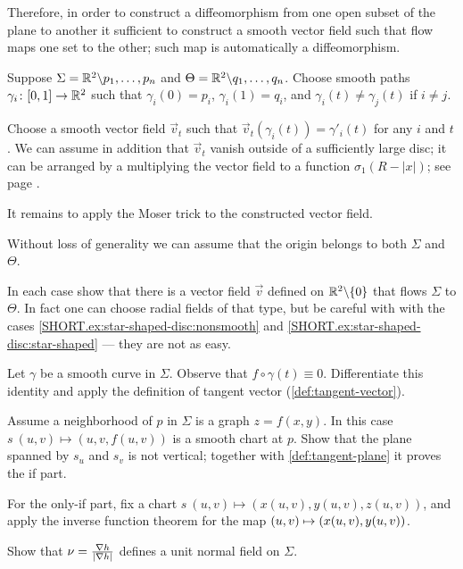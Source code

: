 Therefore, in order to construct a diffeomorphism from one open subset of the plane to another it sufficient to construct a smooth vector field such that flow maps one set to the other;
such map is automatically a diffeomorphism.


Suppose $\Sigma=\mathbb{R}^2\backslash{p_1,\dots,p_n}$ and $\Theta=\mathbb{R}^2\backslash{q_1,\dots,q_n}$.
Choose smooth paths $\gamma_i\colon[0,1]\to \mathbb{R}^2$ such that $\gamma_i(0)=p_i$,
$\gamma_i(1)=q_i$, and $\gamma_i(t)\ne \gamma_j(t)$ if $i\ne j$.

Choose a smooth vector field $\vec v_t$ such that $\vec v_t(\gamma_i(t))=\gamma'_i(t)$ for any $i$ and $t$.
We can assume in addition that $\vec v_t$ vanish outside of a sufficiently large disc; it can be arranged by a multiplying the vector field to a function 
$\sigma_1(R-|x|)$; see page \pageref{page:sigma-function}.

It remains to apply the Moser trick to the constructed vector field. 

Without loss of generality we can assume that the origin belongs to both $\Sigma$ and $\Theta$.

In each case show that there is a vector field $\vec v$ defined on $\mathbb{R}^2\backslash\{0\}$ that flows $\Sigma$ to $\Theta$.
In fact one can choose radial fields of that type,
but be careful with with the cases \ref{SHORT.ex:star-shaped-disc:nonsmooth} and \ref{SHORT.ex:star-shaped-disc:star-shaped} --- they are not as easy.

Let $\gamma$ be a smooth curve in $\Sigma$.
Observe that $f\circ\gamma(t)\equiv 0$.
Differentiate this identity and apply the definition of tangent vector (\ref{def:tangent-vector}).

Assume a neighborhood of $p$ in $\Sigma$ is a graph $z=f(x,y)$.
In this case $s\:(u,v)\mapsto (u,v,f(u,v))$ is a smooth chart at $p$.
Show that the plane spanned by $s_u$ and $s_v$ is not vertical;
together with \ref{def:tangent-plane} it proves the if part.

For the only-if part, fix a chart 
$s\:(u,v)\mapsto(x(u,v),y(u,v),z(u,v))$,
and apply the inverse function theorem for the map $(u,v)\z\mapsto(x(u,v),y(u,v))$.


 Show that $\nu=\tfrac{\nabla h}{|\nabla h|}$ defines a unit normal field on $\Sigma$.

